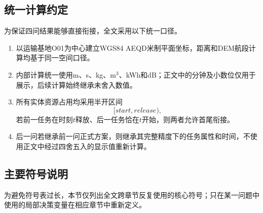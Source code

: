 \documentclass[UTF8,a4paper,12pt]{ctexart}
\begin{document}
\subsection{统一计算约定}

为保证四问结果能够直接衔接，全文采用以下统一口径。

\begin{enumerate}[label=(\arabic*),leftmargin=3.0em]
\item 以运输基地O01为中心建立WGS84 AEQD米制平面坐标，距离和DEM航段计算均基于同一空间口径。
\item 内部计算统一使用m、s、kg、m$^3$、kWh和dB；正文中的分钟及小数位仅用于展示，后续计算始终继承未舍入数值。
\item 所有实体资源占用均采用半开区间
\[
[start,release),
\]
若前一任务在时刻$t$释放、后一任务恰在$t$开始，则两者允许首尾衔接。
\item 后一问若继承前一问正式方案，则继承其完整精度下的任务属性和时间，不使用正文中经过四舍五入的显示值重新计算。
\end{enumerate}

\subsection{主要符号说明}

为避免符号表过长，本节仅列出全文跨章节反复使用的核心符号；只在某一问题中使用的局部决策变量在相应章节中重新定义。
\end{document}
